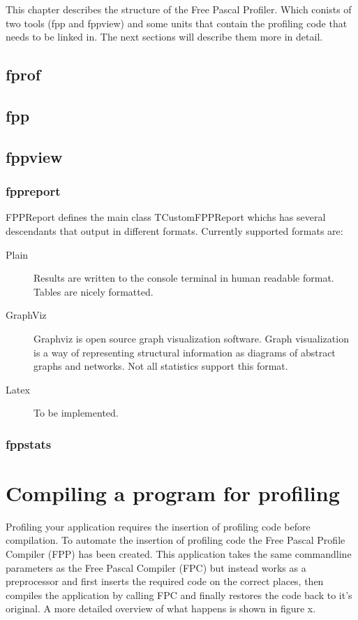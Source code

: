 \documentclass[twoside]{book}
\begin{document}
This chapter describes the structure of the Free Pascal Profiler. Which conists of two 
tools (fpp and fppview) and some units that contain the profiling code that needs to
be linked in. The next sections will describe them more in detail.

\section{fprof}

\section{fpp}

\section{fppview}

\subsection{fppreport}
FPPReport defines the main class TCustomFPPReport whichs has several descendants that 
output in different formats. Currently supported formats are:

\begin{description}
	\item[Plain] Results are written to the console terminal in human readable format. Tables 
	are nicely formatted.
	\item[GraphViz] Graphviz is open source graph visualization software. Graph visualization 
	is a way of representing structural information as diagrams of abstract graphs and networks. 
	Not all statistics support this format.
	\item[Latex] To be implemented.
\end{description}

\subsection{fppstats}

\chapter{Compiling a program for profiling}
Profiling your application requires the insertion of profiling code before compilation. 
To automate the insertion of profiling code the Free Pascal Profile Compiler (FPP) has 
been created. This application takes the same commandline parameters as the Free Pascal Compiler
(FPC) but instead works as a preprocessor and first inserts the required code on the correct places, 
then compiles the application by calling FPC and finally restores the code back to it's original. A more detailed overview of 
what happens is shown in figure x.
\end{document}
